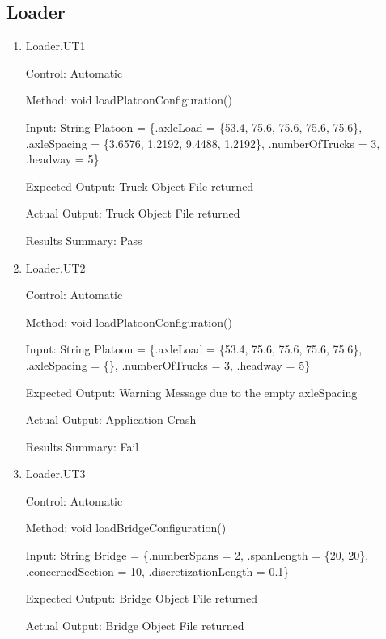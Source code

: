 \documentclass[12pt, titlepage]{article}
\begin{document}
    \subsection{Loader}
\begin{enumerate}
    \item{Loader.UT1\\}
    
    Control: Automatic
    
    Method:  void loadPlatoonConfiguration()
    
    Input: String Platoon = \{.axleLoad = \{53.4, 75.6, 75.6, 75.6, 75.6\},
                        .axleSpacing = \{3.6576, 1.2192, 9.4488, 1.2192\},
                        .numberOfTrucks = 3,
                        .headway = 5\}
    
    Expected Output: Truck Object File returned 

    Actual Output: Truck Object File returned
    
    Results Summary: Pass

    \item{Loader.UT2\\}
    
    Control: Automatic
    
    Method:  void loadPlatoonConfiguration()
    
    Input: String Platoon = \{.axleLoad = \{53.4, 75.6, 75.6, 75.6, 75.6\},
                        .axleSpacing = \{\},
                        .numberOfTrucks = 3,
                        .headway = 5\}
    
    Expected Output: Warning Message due to the empty axleSpacing

    Actual Output: Application Crash

    Results Summary: Fail

    \item{Loader.UT3\\}
    
    Control: Automatic
    
    Method:  void loadBridgeConfiguration()
    
    Input: String Bridge = \{.numberSpans = 2,
                         .spanLength = \{20, 20\},
                         .concernedSection = 10,
                         .discretizationLength = 0.1\}
    
    Expected Output: Bridge Object File returned 

    Actual Output: Bridge Object File returned 


\end{enumerate}
\end{document}

